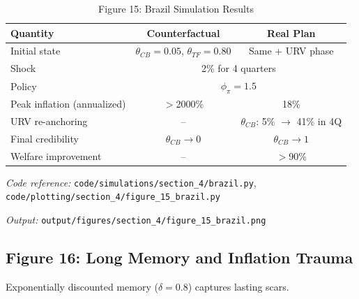 \documentclass[11pt]{article}
\begin{document}
\begin{table}[htbp]
\centering
\caption{Figure 15: Brazil Simulation Results}
\label{tab:brazil}
\begin{threeparttable}
\begin{tabular}{lcc}
\toprule
Quantity & Counterfactual & Real Plan \\
\midrule
Initial state & $\theta_{CB} = 0.05$, $\theta_{TF} = 0.80$ & Same + URV phase \\
Shock & \multicolumn{2}{c}{2\% for 4 quarters} \\
Policy & \multicolumn{2}{c}{$\phi_\pi = 1.5$} \\
\midrule
Peak inflation (annualized) & $>$2000\% & 18\% \\
URV re-anchoring & -- & $\theta_{CB}$: 5\% $\to$ 41\% in 4Q \\
Final credibility & $\theta_{CB} \to 0$ & $\theta_{CB} \to 1$ \\
Welfare improvement & -- & $>$90\% \\
\bottomrule
\end{tabular}
\begin{tablenotes}
\small
\item \textit{Code reference:} \texttt{code/simulations/section\_4/brazil.py}, \texttt{code/plotting/section\_4/figure\_15\_brazil.py}
\item \textit{Output:} \texttt{output/figures/section\_4/figure\_15\_brazil.png}
\end{tablenotes}
\end{threeparttable}
\end{table}

\subsection{Figure 16: Long Memory and Inflation Trauma}

Exponentially discounted memory ($\delta = 0.8$) captures lasting scars.
\end{document}
